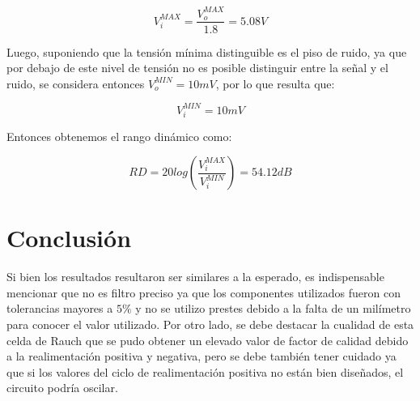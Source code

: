 \begin{equation}
    V_i^{MAX} = \frac{V_o^{MAX}}{1.8} = 5.08V
\end{equation}

Luego, suponiendo que la  tensi\'on m\'inima distinguible es el piso de ruido, ya que por debajo de este nivel de tensi\'on no es posible distinguir entre la se\~nal y el ruido, se considera entonces $V_o^{MIN}=10mV$, por lo que resulta que:

\begin{equation}
    V_i^{MIN} = 10mV
\end{equation}

Entonces obtenemos el rango dinámico como:

\begin{equation}
    RD = 20log(\frac{V_i^{MAX}}{V_i^{MIN}})= 54.12dB
\end{equation}

\section{Conclusión}

Si bien los resultados resultaron ser similares a la esperado, es indispensable mencionar que no es filtro preciso ya que los componentes utilizados fueron con tolerancias mayores a $5\%$ y no se utilizo prestes debido a la falta de un milímetro para conocer el valor utilizado. Por otro lado, se debe destacar la cualidad de esta celda de Rauch que se pudo obtener un elevado valor de factor de calidad debido a la realimentación positiva y negativa, pero se debe también tener cuidado ya que si los valores del ciclo de realimentación positiva no están bien diseñados, el circuito podría oscilar.
